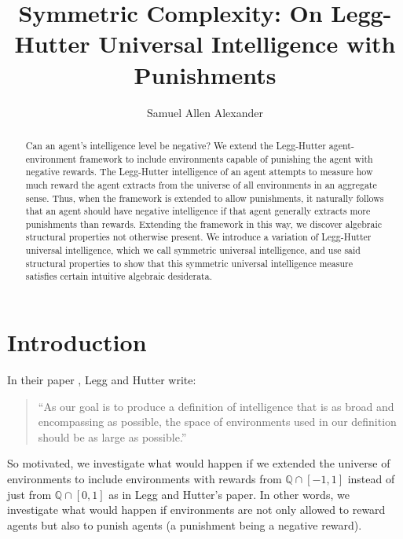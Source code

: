 \documentclass{article}
\title{Symmetric Complexity: On Legg-Hutter Universal Intelligence with Punishments}
\author{Samuel Allen Alexander}
\begin{document}
\maketitle

\begin{abstract}
    Can an agent's intelligence level be negative?
    We extend the Legg-Hutter agent-environment framework to include environments
    capable of punishing the agent with negative rewards. The Legg-Hutter
    intelligence of an agent attempts to measure how much reward the agent
    extracts from the universe of all environments in an aggregate sense. Thus,
    when the framework is extended to allow punishments, it naturally follows
    that an agent should have negative intelligence if that agent generally
    extracts more punishments than rewards.
    Extending the framework in this way, we discover algebraic structural properties
    not otherwise present. We introduce a variation of Legg-Hutter universal
    intelligence, which we call symmetric universal intelligence, and use said
    structural properties to show that this symmetric universal intelligence
    measure satisfies certain intuitive algebraic desiderata.
\end{abstract}

\section{Introduction}

In their paper \cite{legg2007universal}, Legg and Hutter write:
\begin{quote}
    ``As our goal is to produce a definition of intelligence that is as broad and
    encompassing as possible, the space of environments used in our definition should
    be as large as possible.''
\end{quote}
So motivated, we investigate what would happen if we extended the universe
of environments to include environments with rewards from $\mathbb Q\cap [-1,1]$
instead of just from $\mathbb Q\cap [0,1]$ as in Legg and Hutter's paper.
In other words, we investigate what would happen if environments are not only
allowed to reward agents but also to punish agents (a punishment being a negative
reward).
\end{document}
